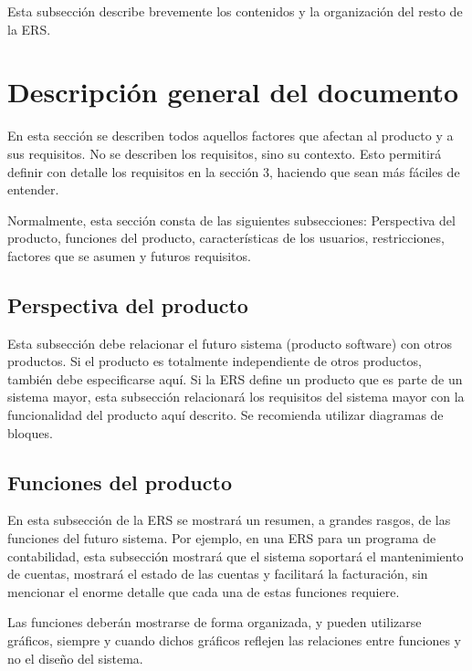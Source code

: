 \documentclass[12pt,a4paper]{article}
\begin{document}
Esta subsección describe brevemente los contenidos y la organización del resto de la ERS.


\section{Descripción general del documento}
\label{sec:descripcion_general}

En esta sección se describen todos aquellos factores que afectan al producto y a sus requisitos. No se describen los requisitos, sino su contexto. Esto permitirá definir con detalle los requisitos en la sección 3, haciendo que sean más fáciles de entender.

Normalmente, esta sección consta de las siguientes subsecciones: Perspectiva del producto, funciones del producto, características de los usuarios, restricciones, factores que se asumen y futuros requisitos.

\subsection{Perspectiva del producto}
\label{sec:perspectiva_producto}

Esta subsección debe relacionar el futuro sistema (producto software) con otros productos. Si el producto es totalmente independiente de otros productos, también debe especificarse aquí. Si la ERS define un producto que es parte de un sistema mayor, esta subsección relacionará los requisitos del sistema mayor con la funcionalidad del producto aquí descrito. Se recomienda utilizar diagramas de bloques.

\subsection{Funciones del producto}
\label{sec:funciones_producto}

En esta subsección de la ERS se mostrará un resumen, a grandes rasgos, de las funciones del futuro sistema. Por ejemplo, en una ERS para un programa de contabilidad, esta subsección mostrará que el sistema soportará el mantenimiento de cuentas, mostrará el estado de las cuentas y facilitará la facturación, sin mencionar el enorme detalle que cada una de estas funciones requiere.

Las funciones deberán mostrarse de forma organizada, y pueden utilizarse gráficos, siempre y cuando dichos gráficos reflejen las relaciones entre funciones y no el diseño del sistema.
\end{document}
